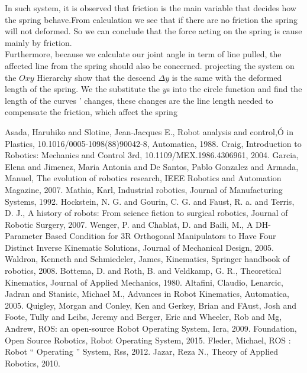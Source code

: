 \documentclass[conference]{IEEEtran}
\begin{document}
In such system, it is observed that friction is the main variable that decides how the spring behave.From calculation we see that if there are no friction the spring will not deformed. So we can conclude that the force acting on the spring is cause mainly by friction. 
\\
Furthermore, because we calculate our joint angle in term of line pulled, the affected line from the spring should also be concerned. projecting the system on the $Oxy$ Hierarchy show that the descend $\Delta y$ is the same with the deformed length of the spring. We the substitute the $y$s into the circle function and find the length of the curves ' changes, these changes are the line length needed to compensate the friction, which affect the spring
\begin{thebibliography}{1}

 Asada, Haruhiko and Slotine, Jean-Jacques E., Robot analysis and control,Ó 	in Plastics, 10.1016/0005-1098(88)90042-8, Automatica, 1988.
 Craig, Introduction to Robotics: Mechanics and Control 3rd, 10.1109/MEX.1986.4306961, 2004.
 Garcia, Elena and Jimenez, Maria Antonia and De Santos, Pablo Gonzalez and Armada, Manuel, The evolution of robotics research, IEEE Robotics and Automation Magazine, 2007.
 Mathia, Karl, Industrial robotics, Journal of Manufacturing Systems, 1992.
 Hockstein, N. G. and Gourin, C. G. and Faust, R. a. and Terris, D. J., A history of robots: From science fiction to surgical robotics, Journal of Robotic Surgery, 2007.
 Wenger, P. and Chablat, D. and Baili, M., A DH-Parameter Based Condition for 3R Orthogonal Manipulators to Have Four Distinct Inverse Kinematic Solutions, Journal of Mechanical Design, 2005.
 Waldron, Kenneth and Schmiedeler, James, Kinematics, Springer handbook of robotics, 2008.
 Bottema, D. and Roth, B. and Veldkamp, G. R., Theoretical Kinematics, Journal of Applied Mechanics, 1980.
 Altafini, Claudio, Lenarcic, Jadran and Stanisic, Michael M., Advances in Robot Kinematics, Automatica, 2005.
 Quigley, Morgan and Conley, Ken and Gerkey, Brian and FAust, Josh and Foote, Tully and Leibs, Jeremy and Berger, Eric and Wheeler, Rob and Mg, Andrew, ROS: an open-source Robot Operating System, Icra, 2009.
 Foundation, Open Source Robotics, Robot Operating System, 2015.
 Fleder, Michael, ROS : Robot “ Operating ” System, Rss, 2012.
 Jazar, Reza N., Theory of Applied Robotics, 2010.

\end{thebibliography}
\end{document}
